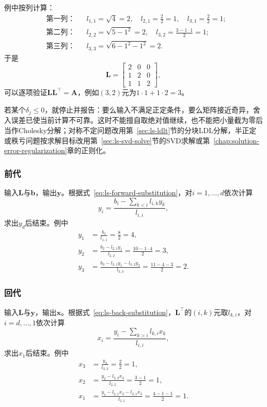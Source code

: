 例中按列计算：
\[
 \begin{aligned}
 &\text{第一列：}&& l_{1,1}=\sqrt{4}=2,\quad l_{2,1}=\tfrac22=1,\quad l_{3,1}=\tfrac22=1;\\
 &\text{第二列：}&& l_{2,2}=\sqrt{5-1^2}=2,\quad l_{3,2}=\tfrac{3-1\cdot1}{2}=1;\\
 &\text{第三列：}&& l_{3,3}=\sqrt{6-1^2-1^2}=2 .
 \end{aligned}
\]
于是
\[
 \bm L=\begin{bmatrix}2&0&0\\1&2&0\\1&1&2\end{bmatrix},
\]
可以逐项验证$\bm L\bm L^\top=\bm A$，例如$(3,2)$元为$1\cdot1+1\cdot2=3$。

若某个$\delta_j\leq0$，就停止并报告：要么输入不满足正定条件，要么矩阵接近奇异，舍入误差已使当前计算不可靠。这时不能擅自取绝对值继续，也不能把小量截为零后当作Cholesky分解；对称不定问题改用第~\ref{sec:ls-ldlt}节的分块LDL分解，半正定或秩亏问题按求解目标改用第~\ref{sec:ls-svd-solve}节的SVD求解或第~\ref{chap:solution-error-regularization}章的正则化。

\subsubsection{前代}
输入$\bm L$与$\bm b$，输出$\bm y$。根据式~\eqref{eq:ls-forward-substitution}，对$i=1,\ldots,d$依次计算
\[
 y_i=\frac{b_i-\sum_{k<i}l_{i,k}y_k}{l_{i,i}} ,
\]
求出$y_d$后结束。例中
\[
 \begin{aligned}
 y_1&=\frac{b_1}{l_{1,1}}=\frac82=4,\\
 y_2&=\frac{b_2-l_{2,1}y_1}{l_{2,2}}=\frac{10-1\cdot4}{2}=3,\\
 y_3&=\frac{b_3-l_{3,1}y_1-l_{3,2}y_2}{l_{3,3}}=\frac{11-4-3}{2}=2 .
 \end{aligned}
\]

\subsubsection{回代}
输入$\bm L$与$\bm y$，输出$\bm x$。根据式~\eqref{eq:ls-back-substitution}，$\bm L^\top$的$(i,k)$元取$l_{k,i}$，对$i=d,\ldots,1$依次计算
 \[
  x_i=\frac{y_i-\sum_{k>i}l_{k,i}x_k}{l_{i,i}} ,
 \]
 求出$x_1$后结束。例中
 \[
  \begin{aligned}
  x_3&=\frac{y_3}{l_{3,3}}=\frac22=1,\\
  x_2&=\frac{y_2-l_{3,2}x_3}{l_{2,2}}=\frac{3-1}{2}=1,\\
  x_1&=\frac{y_1-l_{2,1}x_2-l_{3,1}x_3}{l_{1,1}}=\frac{4-1-1}{2}=1 .
  \end{aligned}
 \]

